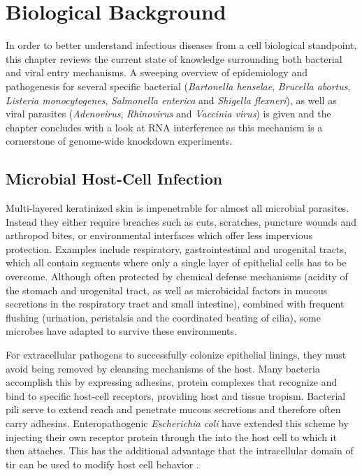\chapter{Biological Background}

In order to better understand infectious diseases from a cell biological standpoint, this chapter reviews the current state of knowledge surrounding both bacterial and viral entry mechanisms. A sweeping overview of epidemiology and pathogenesis for several specific bacterial (\textit{Bartonella henselae}, \textit{Brucella abortus}, \textit{Listeria monocytogenes}, \textit{Salmonella enterica} and \textit{Shigella flexneri}), as well as viral parasites (\textit{Adenovirus}, \textit{Rhinovirus} and \textit{Vaccinia virus}) is given and the chapter concludes with a look at RNA interference as this mechanism is a cornerstone of genome-wide knockdown experiments.

\section{Microbial Host-Cell Infection}

Multi-layered keratinized skin is impenetrable for almost all microbial parasites. Instead they either require breaches such as cuts, scratches, puncture wounds and arthropod bites, or environmental interfaces which offer less impervious protection. Examples include respiratory, gastrointestinal and urogenital tracts, which all contain segments where only a single layer of epithelial cells has to be overcome. Although often protected by chemical defense mechanisms (acidity of the stomach and urogenital tract, as well as microbicidal factors in mucous secretions in the respiratory tract and small intestine), combined with frequent flushing (urination, peristalsis and the coordinated beating of cilia), some microbes have adapted to survive these environments.

For extracellular pathogens to successfully colonize epithelial linings, they must avoid being removed by cleansing mechanisms of the host. Many bacteria accomplish this by expressing adhesins, protein complexes that recognize and bind to specific host-cell receptors, providing host and tissue tropism. Bacterial pili serve to extend reach and penetrate mucous secretions and therefore often carry adhesins. Enteropathogenic \textit{Escherichia coli} have extended this scheme by injecting their own receptor protein  through the  into the host cell to which it then attaches. This has the additional advantage that the intracellular domain of \gls{tir} can be used to modify host cell behavior \citep{Alberts2008}.

